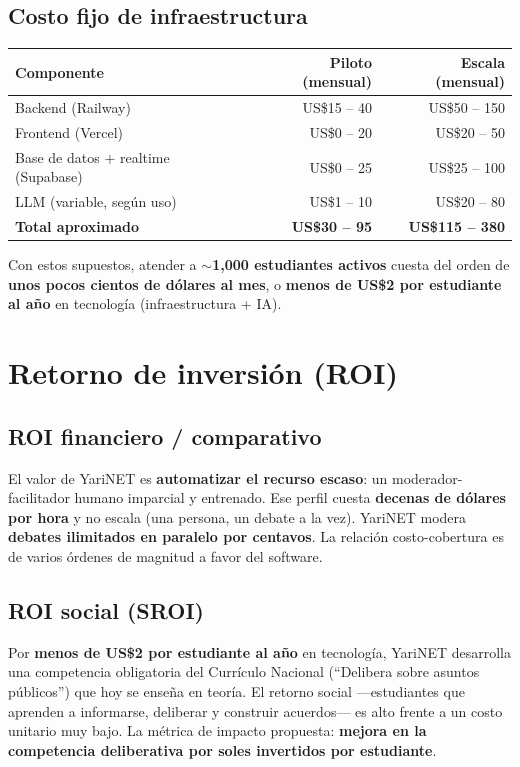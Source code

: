 \documentclass[11pt,a4paper]{article}
\newcommand{\usd}{US\$}
\begin{document}
\subsection{Costo fijo de infraestructura}
\begin{tabularx}{\textwidth}{@{}X r r@{}}
\toprule
\textbf{Componente} & \textbf{Piloto (mensual)} & \textbf{Escala (mensual)} \\
\midrule
Backend (Railway) & \usd 15 -- 40 & \usd 50 -- 150 \\
Frontend (Vercel) & \usd 0 -- 20 & \usd 20 -- 50 \\
Base de datos + realtime (Supabase) & \usd 0 -- 25 & \usd 25 -- 100 \\
LLM (variable, seg\'un uso) & \usd 1 -- 10 & \usd 20 -- 80 \\
\midrule
\textbf{Total aproximado} & \textbf{\usd 30 -- 95} & \textbf{\usd 115 -- 380} \\
\bottomrule
\end{tabularx}

\medskip
\noindent Con estos supuestos, atender a \textbf{$\sim$1{,}000 estudiantes activos} cuesta del orden de \textbf{unos pocos cientos de d\'olares al mes}, o \textbf{menos de \usd 2 por estudiante al a\~no} en tecnolog\'ia (infraestructura + IA).

\section{Retorno de inversi\'on (ROI)}

\subsection{ROI financiero / comparativo}
El valor de YariNET es \textbf{automatizar el recurso escaso}: un moderador-facilitador humano imparcial y entrenado. Ese perfil cuesta \textbf{decenas de d\'olares por hora} y no escala (una persona, un debate a la vez). YariNET modera \textbf{debates ilimitados en paralelo por centavos}. La relaci\'on costo-cobertura es de varios \'ordenes de magnitud a favor del software.

\subsection{ROI social (SROI)}
Por \textbf{menos de \usd 2 por estudiante al a\~no} en tecnolog\'ia, YariNET desarrolla una competencia obligatoria del Curr\'iculo Nacional (``Delibera sobre asuntos p\'ublicos'') que hoy se ense\~na en teor\'ia. El retorno social ---estudiantes que aprenden a informarse, deliberar y construir acuerdos--- es alto frente a un costo unitario muy bajo. La m\'etrica de impacto propuesta: \textbf{mejora en la competencia deliberativa por soles invertidos por estudiante}.
\end{document}
